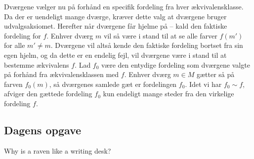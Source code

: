 \begin{minipage}[t]{100mm}
Dværgene vælger nu på forhånd en specifik fordeling fra hver ækvivalensklasse. Da der er uendeligt mange dværge, kræver dette valg at dværgene bruger udvalgsaksiomet.
Herefter når dværgene får hjelme på -- kald den faktiske fordeling for $f$. Enhver dværg $m$ vil så være i stand til at se alle farver $f(m')$ for alle $m'\neq m$. Dværgene vil altså kende den faktiske fordeling bortset fra sin egen hjelm, og da dette er en endelig fejl, vil dværgene være i stand til at bestemme ækvivalens $f$. Lad $f_0$ være den entydige fordeling som dværgene valgte på forhånd fra ækvivalensklassen med $f$. Enhver dværg $m\in M$ gætter så på farven $f_0(m)$, så dværgenes samlede gæt er fordelingen $f_0$. Idet vi har $f_0\sim f$, afviger den gættede fordeling $f_0$ kun endeligt mange steder fra den virkelige fordeling $f$.

\begin{center}
\section*{Dagens opgave}
Why is a raven like a writing desk?
\end{center}

\end{minipage}
